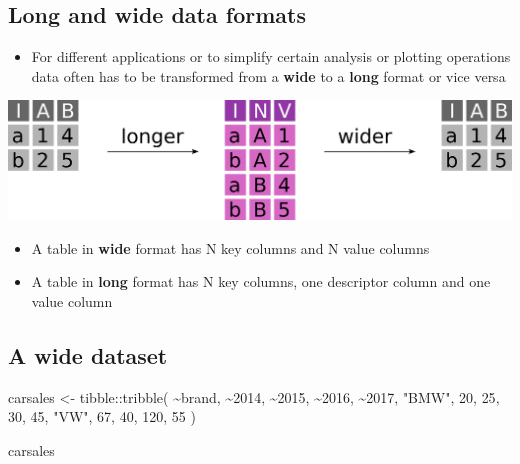 \documentclass[
  letterpaper,
]{book}
\newenvironment{Shaded}{}{}
\newcommand{\AttributeTok}[1]{\textcolor[rgb]{0.84,0.23,0.29}{#1}}
\newcommand{\DecValTok}[1]{\textcolor[rgb]{0.00,0.36,0.77}{#1}}
\newcommand{\FunctionTok}[1]{\textcolor[rgb]{0.44,0.26,0.76}{#1}}
\newcommand{\NormalTok}[1]{\textcolor[rgb]{0.14,0.16,0.18}{#1}}
\newcommand{\OtherTok}[1]{\textcolor[rgb]{0.44,0.26,0.76}{#1}}
\newcommand{\SpecialCharTok}[1]{\textcolor[rgb]{0.00,0.36,0.77}{#1}}
\newcommand{\StringTok}[1]{\textcolor[rgb]{0.01,0.18,0.38}{#1}}
\providecommand{\tightlist}{%
  \setlength{\itemsep}{0pt}\setlength{\parskip}{0pt}}\usepackage{longtable,booktabs,array}
\begin{document}
\hypertarget{long-and-wide-data-formats}{%
\subsection{Long and wide data
formats}\label{long-and-wide-data-formats}}

\begin{itemize}
\tightlist
\item
  For different applications or to simplify certain analysis or plotting
  operations data often has to be transformed from a \textbf{wide} to a
  \textbf{long} format or vice versa
\end{itemize}

\includegraphics{assets/images/chapters/introduction-to-r/pivot_longer_wider.png}

\begin{itemize}
\tightlist
\item
  A table in \textbf{wide} format has N key columns and N value columns
\item
  A table in \textbf{long} format has N key columns, one descriptor
  column and one value column
\end{itemize}

\hypertarget{a-wide-dataset}{%
\subsection{A wide dataset}\label{a-wide-dataset}}

\begin{Shaded}
\begin{Highlighting}[]
\NormalTok{carsales }\OtherTok{\textless{}{-}}\NormalTok{ tibble}\SpecialCharTok{::}\FunctionTok{tribble}\NormalTok{(}
  \SpecialCharTok{\textasciitilde{}}\NormalTok{brand, }\SpecialCharTok{\textasciitilde{}}\StringTok{\textasciigrave{}}\AttributeTok{2014}\StringTok{\textasciigrave{}}\NormalTok{, }\SpecialCharTok{\textasciitilde{}}\StringTok{\textasciigrave{}}\AttributeTok{2015}\StringTok{\textasciigrave{}}\NormalTok{, }\SpecialCharTok{\textasciitilde{}}\StringTok{\textasciigrave{}}\AttributeTok{2016}\StringTok{\textasciigrave{}}\NormalTok{, }\SpecialCharTok{\textasciitilde{}}\StringTok{\textasciigrave{}}\AttributeTok{2017}\StringTok{\textasciigrave{}}\NormalTok{,}
  \StringTok{"BMW"}\NormalTok{,  }\DecValTok{20}\NormalTok{,      }\DecValTok{25}\NormalTok{,      }\DecValTok{30}\NormalTok{,      }\DecValTok{45}\NormalTok{,}
  \StringTok{"VW"}\NormalTok{,   }\DecValTok{67}\NormalTok{,      }\DecValTok{40}\NormalTok{,     }\DecValTok{120}\NormalTok{,      }\DecValTok{55}
\NormalTok{)}

\NormalTok{carsales}
\end{Highlighting}
\end{Shaded}
\end{document}
